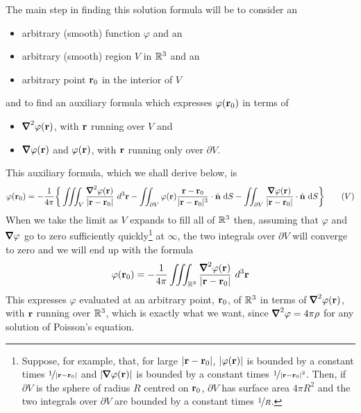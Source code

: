 The main step in finding this solution formula will be to consider an
\begin{itemize}\itemsep1pt \parskip0pt  \itemindent 15pt
\item[]
arbitrary (smooth) function $\varphi$ and an 
\item[]
arbitrary (smooth) region $V$  in $\mathbb{R}^3$ and an
\item[]
arbitrary point $\mathbf{r}_0$ in the interior of $V$
\end{itemize}
and to find an auxiliary formula which expresses $\varphi(\mathbf{r}_0)$ in terms of 
\begin{itemize}\itemsep1pt \parskip0pt  \itemindent 15pt
\item[]
$\vnabla^2\varphi(\vr)$, with $\mathbf{r}$ running over $V$ and
\item[]
$\vnabla\varphi(\vr)$ and $\varphi(\mathbf{r})$, with $\mathbf{r}$ running only over 
$\partial V$.
\end{itemize}
This auxiliary formula, which we shall derive below, is
\begin{equation}
\varphi(\vr_0)=-\frac{1}{4\pi}\bigg\{
\tripInt_V\frac{ \vnabla^2\varphi(\vr)}{|\vr-\vr_0|}\ d^3\vr
-\dblInt_{\partial V}\varphi(\vr)\frac{\vr-\vr_0}{|\vr-\vr_0|^3}\cdot\hn\ \dee{S}
-\dblInt_{\partial V}\frac{\vnabla\varphi(\vr)}{|\vr-\vr_0|}\cdot\hn\ \dee{S}\bigg\}
\tag{$V$}
\end{equation}
When we take the limit as $V$ expands to fill all of $\mathbb{R}^3$ then,
assuming that $\varphi$ and $\vnabla\varphi$ go to zero sufficiently 
quickly\footnote{Suppose, for example, that, for large $|\mathbf{r}-\mathbf{r}_0|$, 
$|\varphi(\mathbf{r})|$ is bounded by a constant times $\nicefrac{1}{|\mathbf{r}-\mathbf{r}_0|}$
and $|\vnabla\varphi(\vr)|$ is bounded by a constant times 
$\nicefrac{1}{|\mathbf{r}-\mathbf{r}_0|^2}$. Then, if $\partial V$ is the sphere of 
radius $R$ centred on $\mathbf{r}_0$,  $\partial V$ has surface area $4\pi R^2$ 
and the two integrals over $\partial V$ are bounded by a constant times
$\nicefrac{1}{R}$.}
at $\infty$, the two integrals over $\partial V$ will converge to zero and
we will end up with the formula 
\begin{equation*}
\varphi(\vr_0)=-\frac{1}{4\pi}
\tripInt_{\bbbr^3}\frac{ \vnabla^2\varphi(\vr)}{|\vr-\vr_0|}\ d^3\vr
\end{equation*}
This expresses $\varphi$ evaluated at an
arbitrary point, $\mathbf{r}_0$, of $\mathbb{R}^3$ in terms of $\vnabla^2\varphi(\vr)$, 
with $\mathbf{r}$ running over $\mathbb{R}^3$, which is exactly what we want, since
$\vnabla^2\varphi = 4\pi\rho$ for any solution of Poisson's equation.
